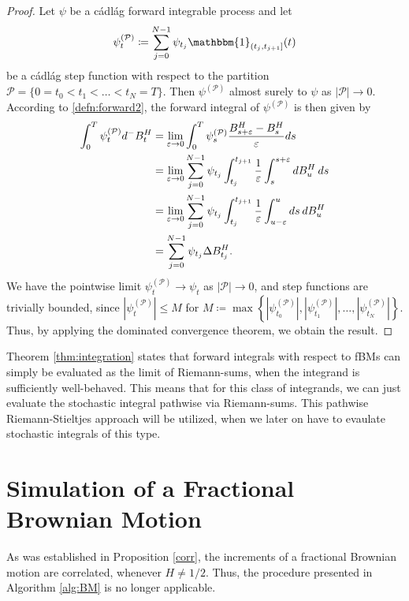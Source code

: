 \begin{proof}
    Let $\psi$ be a cádlág forward integrable process and let
    \begin{equation}
        \psi^{(\mathcal{P})}_{t}\coloneqq \sum_{j=0}^{N-1}\psi_{t_{j}}\mathbbm{1}_{(t_{j},t_{j+1}]}(t)
    \end{equation}
    be a cádlág step function with respect to the partition $\mathcal{P}=\{0=t_{0}<t_{1}<\dots <t_{N}=T\}$. Then $\psi^{(\mathcal{P})}$ almost surely to $\psi$ as $|\mathcal{P}|\to 0$. According to \eqref{defn:forward2}, the forward integral of $\psi^{(\mathcal{P})}$ is then given by
    \begin{align}
        \int_{0}^{T}\psi^{(\mathcal{P})}_{t}d^{-}B^{H}_{t}&=\lim_{\varepsilon\to 0}\int_{0}^{T}\psi^{(\mathcal{P})}_{s}\frac{B^{H}_{s+\varepsilon}-B_{s}^{H}}{\varepsilon}ds\\
        &= \lim_{\varepsilon\to 0}\sum_{j=0}^{N-1}\psi_{t_{j}}\int_{t_{j}}^{t_{j+1}}\frac{1}{\varepsilon}\int_{s}^{s+\varepsilon}dB_{u}^{H}\hspace{2 pt}ds\\
        &= \lim_{\varepsilon\to 0}\sum_{j=0}^{N-1}\psi_{t_{j}}\int_{t_{j}}^{t_{j+1}}\frac{1}{\varepsilon}\int_{u-\varepsilon}^{u}ds\hspace{2 pt}dB_{u}^{H}\\
        &= \sum_{j=0}^{N-1}\psi_{t_{j}}\Delta B_{t_{j}}^{H}.
    \end{align}
We have the pointwise limit $\psi^{(\mathcal{P})}_{t}\to\psi_{t}$ as $|\mathcal{P}|\to 0$, and step functions are trivially bounded, since $|\psi^{(\mathcal{P})}_{t}|\leq M$ for $M\coloneqq \max\left\{|\psi^{(\mathcal{P})}_{t_{0}}|, |\psi^{(\mathcal{P})}_{t_{1}}|,\dots,|\psi^{(\mathcal{P})}_{t_{N}}|\right\}$. Thus, by applying the dominated convergence theorem, we obtain the result.
\end{proof}
Theorem \ref{thm:integration} states that forward integrals with respect to fBMs can simply be evaluated as the limit of Riemann-sums, when the integrand is sufficiently well-behaved. This means that for this class of integrands, we can just evaluate the stochastic integral pathwise via Riemann-sums. This pathwise Riemann-Stieltjes approach will be utilized, when we later on have to evaulate stochastic integrals of this type. 
\section{Simulation of a Fractional Brownian Motion}
As was established in Proposition \ref{corr}, the increments of a fractional Brownian motion are correlated, whenever $H\neq 1/2$. Thus, the procedure presented in Algorithm \ref{alg:BM} is no longer applicable.

